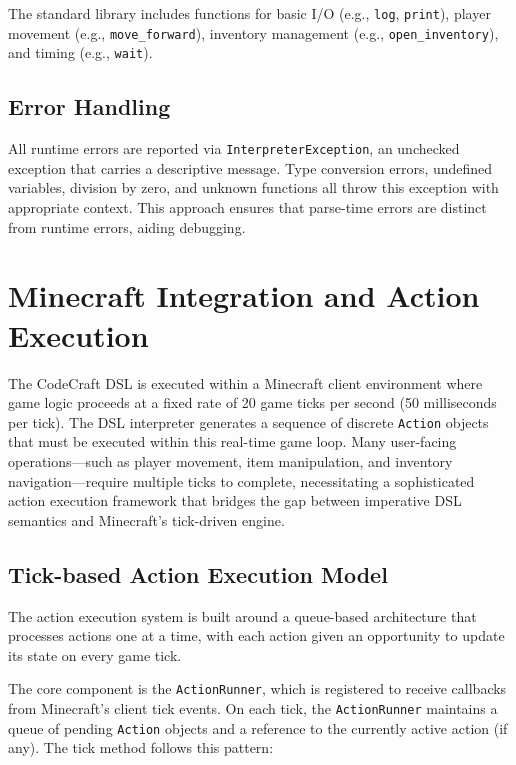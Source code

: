 The standard library includes functions for basic I/O (e.g., \texttt{log}, \texttt{print}), player movement (e.g., \texttt{move\_forward}), inventory management (e.g., \texttt{open\_inventory}), and timing (e.g., \texttt{wait}).

\subsection{Error Handling}

All runtime errors are reported via \texttt{InterpreterException}, an unchecked exception that carries a descriptive message.
Type conversion errors, undefined variables, division by zero, and unknown functions all throw this exception with appropriate context.
This approach ensures that parse-time errors are distinct from runtime errors, aiding debugging.

\section{Minecraft Integration and Action Execution}

The CodeCraft DSL is executed within a Minecraft client environment where game logic proceeds at a fixed rate of 20 game ticks per second (50 milliseconds per tick).
The DSL interpreter generates a sequence of discrete \texttt{Action} objects that must be executed within this real-time game loop.
Many user-facing operations---such as player movement, item manipulation, and inventory navigation---require multiple ticks to complete, necessitating a sophisticated action execution framework that bridges the gap between imperative DSL semantics and Minecraft's tick-driven engine.

\subsection{Tick-based Action Execution Model}

The action execution system is built around a queue-based architecture that processes actions one at a time, with each action given an opportunity to update its state on every game tick.

The core component is the \texttt{ActionRunner}, which is registered to receive callbacks from Minecraft's client tick events.
On each tick, the \texttt{ActionRunner} maintains a queue of pending \texttt{Action} objects and a reference to the currently active action (if any).
The tick method follows this pattern:

